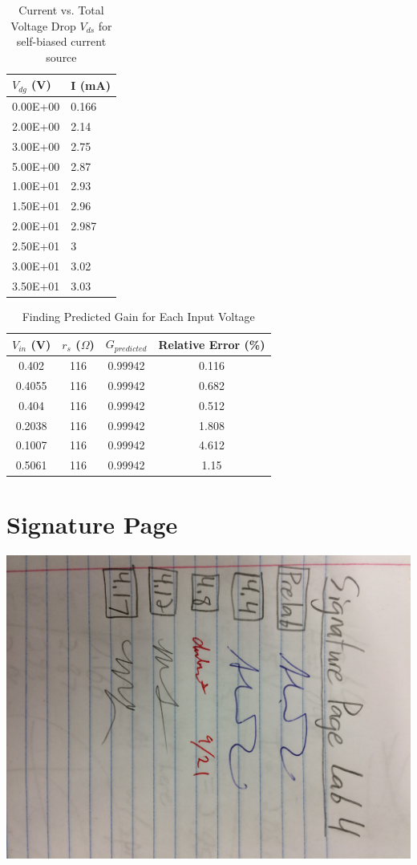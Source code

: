 \documentclass{article}
\begin{document}
    \begin{table}[H]
        \centering
        \caption{Current vs. Total Voltage Drop $V_{ds}$ for self-biased current source}
        \label{my-label}
        \begin{tabular}{ll}
        \textbf{$V_{dg}$ (V)} & \textbf{I (mA)} \\ \hline
        0.00E+00 & 0.166 \\
        2.00E+00 & 2.14 \\
        3.00E+00 & 2.75 \\
        5.00E+00 & 2.87 \\
        1.00E+01 & 2.93 \\
        1.50E+01 & 2.96 \\
        2.00E+01 & 2.987 \\
        2.50E+01 & 3 \\
        3.00E+01 & 3.02 \\
        3.50E+01 & 3.03
        \end{tabular}
    \end{table}
    \begin{table}[H]
        \centering
        \caption{Finding Predicted Gain for Each Input Voltage}
        \label{my-label}
        \begin{tabular}{cccc}
        \textbf{$V_{in}$ (V)} & \textbf{$r_s$ ($\Omega$)} & \textbf{$G_{predicted}$} & \textbf{Relative Error (\%)} \\ \hline
        0.402 & 116 & 0.99942 & 0.116 \\
        0.4055 & 116 & 0.99942 & 0.682 \\
        0.404 & 116 & 0.99942 & 0.512 \\
        0.2038 & 116 & 0.99942 & 1.808 \\
        0.1007 & 116 & 0.99942 & 4.612 \\
        0.5061 & 116 & 0.99942 & 1.15
        \end{tabular}
    \end{table}


\section{Signature Page}
\centering
\includegraphics[scale = 0.1,angle = -90]{IMG_1154.jpeg}
\end{document}
